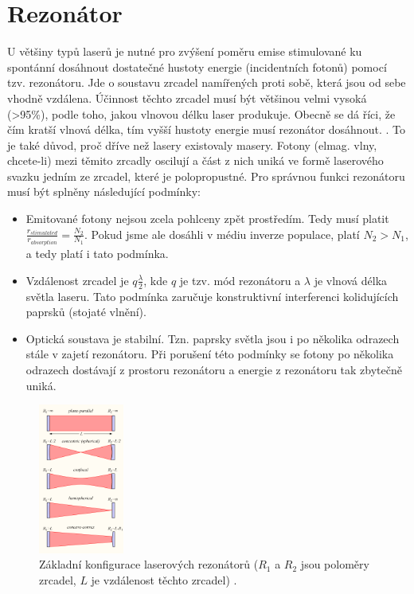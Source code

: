 \documentclass[a4paper,12pt]{article}
\begin{document}
\section{Rezonátor}
U většiny typů laserů je nutné pro zvýšení poměru emise stimulované ku spontánní dosáhnout dostatečné hustoty energie (incidentních fotonů) pomocí tzv. rezonátoru.
Jde o soustavu zrcadel namířených proti sobě, která jsou od sebe vhodně vzdálena.
Účinnost těchto zrcadel musí být většinou velmi vysoká (\textgreater 95\%), podle toho, jakou vlnovou délku laser produkuje. Obecně se dá říci, že čím kratší vlnová délka, tím vyšší hustoty energie musí rezonátor dosáhnout. \cite{funds}. To je také důvod, proč dříve než lasery existovaly masery.
Fotony (elmag. vlny, chcete-li) mezi těmito zrcadly oscilují a část z nich uniká ve formě laserového svazku jedním ze zrcadel, které je polopropustné. Pro správnou funkci rezonátoru musí být splněny následující podmínky:
\begin{itemize}
\item Emitované fotony nejsou zcela pohlceny zpět prostředím. Tedy musí platit $\frac{r_{stimulated}}{r_{absorption}} = \frac{N_2}{N_1}$. Pokud jsme ale dosáhli v médiu inverze populace, platí $N_2>N_1$, a tedy platí i tato podmínka.
\item Vzdálenost zrcadel je $q\frac{\lambda}{2}$, kde $q$ je tzv. mód rezonátoru a $\lambda$ je vlnová délka světla laseru. Tato podmínka zaručuje konstruktivní interferenci kolidujících paprsků (stojaté vlnění).
\item Optická soustava je stabilní. Tzn. paprsky světla jsou i po několika odrazech stále v zajetí rezonátoru. Při porušení této podmínky se fotony po několika odrazech dostávají z prostoru rezonátoru a energie z rezonátoru tak zbytečně uniká.

\end{itemize}

\begin{figure}[h!]
  \centering
  \includegraphics[width=0.25\textwidth]{images/image00.png}
\caption{Základní konfigurace laserových rezonátorů ($R_1$ a $R_2$ jsou poloměry zrcadel, $L$ je vzdálenost těchto zrcadel) \cite{cavity}.}
\end{figure}
\end{document}

